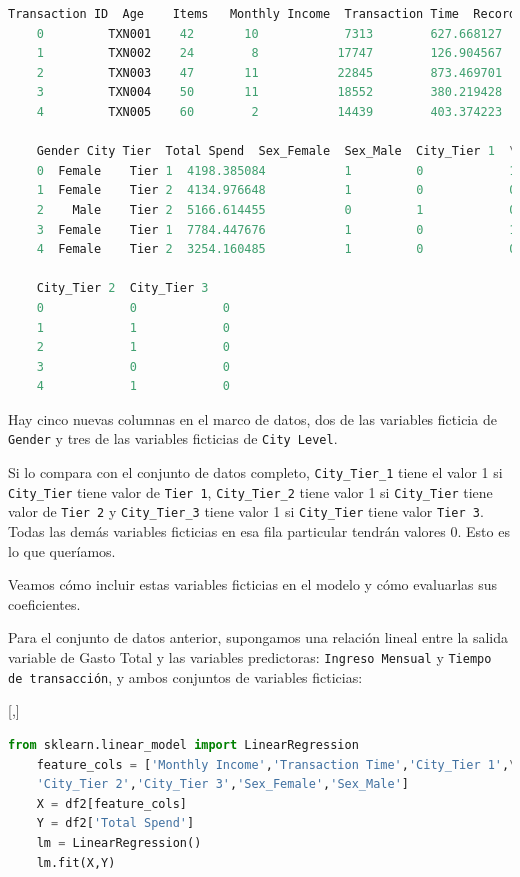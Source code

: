\begin{lstlisting}[language=Python]
	Transaction ID  Age    Items   Monthly Income  Transaction Time  Record  \
	0         TXN001    42       10            7313        627.668127       5
	1         TXN002    24        8           17747        126.904567       3
	2         TXN003    47       11           22845        873.469701       2
	3         TXN004    50       11           18552        380.219428       7
	4         TXN005    60        2           14439        403.374223       2
	
	Gender City Tier  Total Spend  Sex_Female  Sex_Male  City_Tier 1  \
	0  Female    Tier 1  4198.385084           1         0            1
	1  Female    Tier 2  4134.976648           1         0            0
	2    Male    Tier 2  5166.614455           0         1            0
	3  Female    Tier 1  7784.447676           1         0            1
	4  Female    Tier 2  3254.160485           1         0            0
	
	City_Tier 2  City_Tier 3
	0            0            0
	1            1            0
	2            1            0
	3            0            0
	4            1            0
\end{lstlisting}


Hay cinco nuevas columnas en el marco de datos, dos de las variables ficticia de \texttt{Gender} y tres de las variables ficticias de \texttt{City Level}.


Si lo compara con el conjunto de datos completo, \texttt{City\_Tier\_1} tiene el valor 1 si \texttt{City\_Tier}
tiene valor de \texttt{Tier 1}, \texttt{City\_Tier\_2} tiene valor 1 si \texttt{City\_Tier} tiene valor de \texttt{Tier 2} y
\texttt{City\_Tier\_3} tiene valor 1 si \texttt{City\_Tier} tiene valor \texttt{Tier 3}. Todas las demás variables ficticias en esa fila particular tendrán valores 0. Esto es lo que queríamos.


Veamos cómo incluir estas variables ficticias en el modelo y cómo evaluarlas
sus coeficientes.

Para el conjunto de datos anterior, supongamos una relación lineal entre la salida
variable de Gasto Total y las variables predictoras: \texttt{Ingreso Mensual} y
\texttt{Tiempo de transacción}, y ambos conjuntos de variables ficticias:

[,]{}

\begin{lstlisting}[language=Python]
	from sklearn.linear_model import LinearRegression
	feature_cols = ['Monthly Income','Transaction Time','City_Tier 1',\
	'City_Tier 2','City_Tier 3','Sex_Female','Sex_Male']
	X = df2[feature_cols]
	Y = df2['Total Spend']
	lm = LinearRegression()
	lm.fit(X,Y)
\end{lstlisting}

